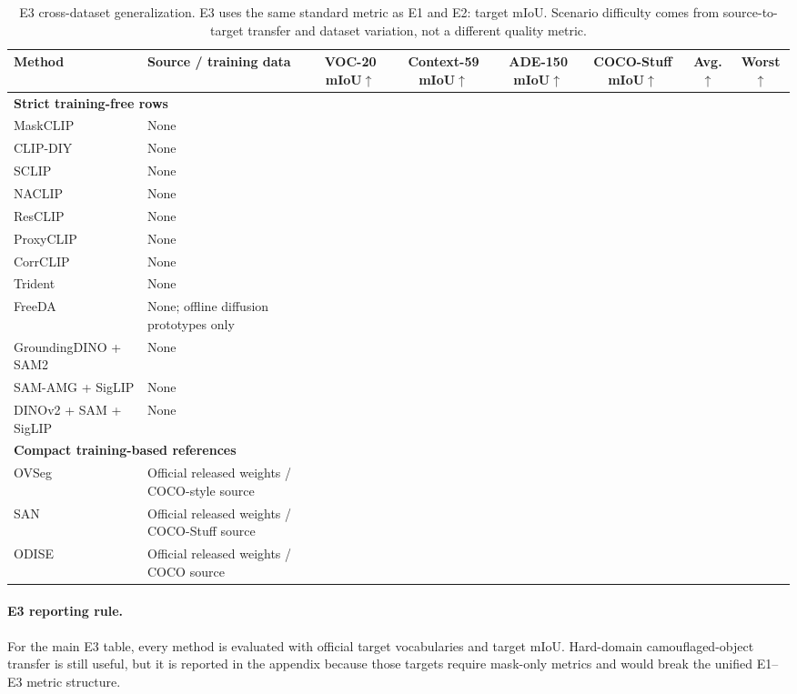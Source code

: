 \documentclass[11pt,a4paper]{article}
\newcommand{\up}{\ensuremath{\uparrow}}
\begin{document}
\begin{table}[H]
\centering
\scriptsize
\caption{E3 cross-dataset generalization. E3 uses the same standard metric as E1 and E2: target mIoU. Scenario difficulty comes from source-to-target transfer and dataset variation, not a different quality metric.}
\label{tab:e3-generalization}
\setlength{\tabcolsep}{2.5pt}
\begin{adjustbox}{max width=\textwidth}
\begin{tabular}{l p{} c c c c c c}
\toprule
Method & Source / training data & VOC-20 mIoU\up & Context-59 mIoU\up & ADE-150 mIoU\up & COCO-Stuff mIoU\up & Avg.\up & Worst\up \\
\midrule
\multicolumn{8}{l}{\textbf{Strict training-free rows}} \\
MaskCLIP & None & & & & & & \\
CLIP-DIY & None & & & & & & \\
SCLIP & None & & & & & & \\
NACLIP & None & & & & & & \\
ResCLIP & None & & & & & & \\
ProxyCLIP & None & & & & & & \\
CorrCLIP & None & & & & & & \\
Trident & None & & & & & & \\
FreeDA & None; offline diffusion prototypes only & & & & & & \\
GroundingDINO + SAM2 & None & & & & & & \\
SAM-AMG + SigLIP & None & & & & & & \\
DINOv2 + SAM + SigLIP & None & & & & & & \\
\midrule
\multicolumn{8}{l}{\textbf{Compact training-based references}} \\
OVSeg & Official released weights / COCO-style source & & & & & & \\
SAN & Official released weights / COCO-Stuff source & & & & & & \\
ODISE & Official released weights / COCO source & & & & & & \\
\bottomrule
\end{tabular}
\end{adjustbox}
\end{table}

\paragraph{E3 reporting rule.}
For the main E3 table, every method is evaluated with official target vocabularies and target mIoU. Hard-domain camouflaged-object transfer is still useful, but it is reported in the appendix because those targets require mask-only metrics and would break the unified E1--E3 metric structure.
\end{document}
